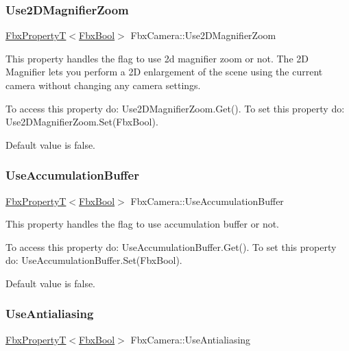 \subsubsection{\texorpdfstring{Use2\+D\+Magnifier\+Zoom}{Use2DMagnifierZoom}}
{\footnotesize\ttfamily \hyperlink{class_fbx_property_t}{Fbx\+PropertyT}$<$\hyperlink{fbxtypes_8h_a92e0562b2fe33e76a242f498b362262e}{Fbx\+Bool}$>$ Fbx\+Camera\+::\+Use2\+D\+Magnifier\+Zoom}

This property handles the flag to use 2d magnifier zoom or not. The 2D Magnifier lets you perform a 2D enlargement of the scene using the current camera without changing any camera settings.

To access this property do\+: Use2\+D\+Magnifier\+Zoom.\+Get(). To set this property do\+: Use2\+D\+Magnifier\+Zoom.\+Set(\+Fbx\+Bool).

Default value is false. \mbox{\label{class_fbx_camera_ae858c35fdbb3ec3bb853bfa739dd2fad}} 
\subsubsection{\texorpdfstring{Use\+Accumulation\+Buffer}{UseAccumulationBuffer}}
{\footnotesize\ttfamily \hyperlink{class_fbx_property_t}{Fbx\+PropertyT}$<$\hyperlink{fbxtypes_8h_a92e0562b2fe33e76a242f498b362262e}{Fbx\+Bool}$>$ Fbx\+Camera\+::\+Use\+Accumulation\+Buffer}

This property handles the flag to use accumulation buffer or not.

To access this property do\+: Use\+Accumulation\+Buffer.\+Get(). To set this property do\+: Use\+Accumulation\+Buffer.\+Set(\+Fbx\+Bool).

Default value is false. \mbox{\label{class_fbx_camera_a2d23acad0d49eadb63be01b826404d34}} 
\subsubsection{\texorpdfstring{Use\+Antialiasing}{UseAntialiasing}}
{\footnotesize\ttfamily \hyperlink{class_fbx_property_t}{Fbx\+PropertyT}$<$\hyperlink{fbxtypes_8h_a92e0562b2fe33e76a242f498b362262e}{Fbx\+Bool}$>$ Fbx\+Camera\+::\+Use\+Antialiasing}

